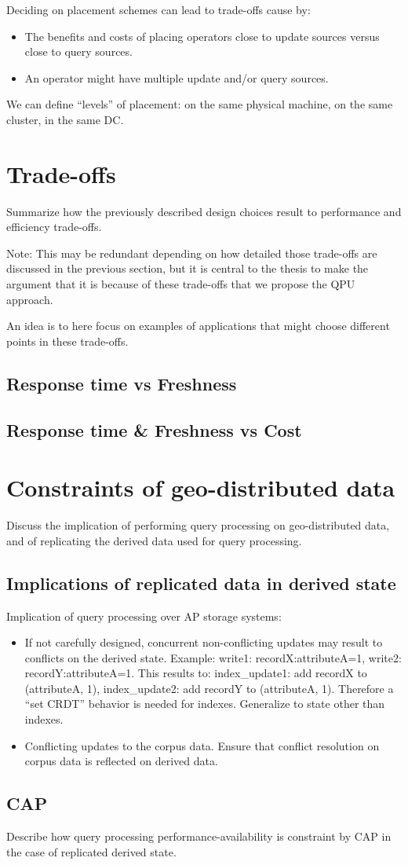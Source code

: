 Deciding on placement schemes can lead to trade-offs cause by:
\begin{itemize}
  \item The benefits and costs of placing operators close to update sources
  versus close to query sources.
  \item An operator might have multiple update and/or query sources.
\end{itemize}

We can define ``levels'' of placement: on the same physical machine, on the same
cluster, in the same DC.

\section{Trade-offs}
Summarize how the previously described design choices result to performance and
efficiency trade-offs.

Note: This may be redundant depending on how detailed those trade-offs are
discussed in the previous section, but it is central to the thesis to make the
argument that it is because of these trade-offs that we propose the QPU
approach.

An idea is to here focus on examples of applications that might choose different
points in these trade-offs.

\subsection{Response time vs Freshness}

\subsection{Response time \& Freshness vs Cost}


\section{Constraints of geo-distributed data}
Discuss the implication of performing query processing on geo-distributed data,
and of replicating the derived data used for query processing.

\subsection{Implications of replicated data in derived state}
Implication of query processing over AP storage systems:
\begin{itemize}
  \item If not carefully designed, concurrent non-conflicting updates may
  result to conflicts on the derived state.
  Example: write1: recordX:attributeA=1, write2: recordY:attributeA=1.
  This results to: index\_update1: add recordX to (attributeA, 1),
  index\_update2: add recordY to (attributeA, 1).
  Therefore a ``set CRDT'' behavior is needed for indexes.
  Generalize to state other than indexes.
  \item Conflicting updates to the corpus data.
  Ensure that conflict resolution on corpus data is reflected on derived data.
\end{itemize}

\subsection{CAP}
Describe how query processing performance-availability is constraint by
CAP in the case of replicated derived state.